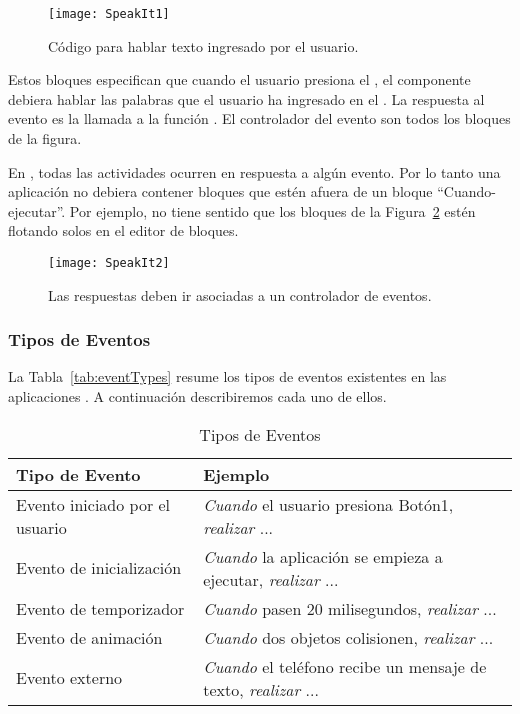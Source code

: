\begin{figure}[H]
  \centering
  \texttt{[image: SpeakIt1]}
  \caption{Código para hablar texto ingresado por el usuario.}
  \label{fig:speakit1}
\end{figure}

Estos bloques especifican que cuando el usuario presiona el , el componente  debiera hablar las palabras que el usuario ha ingresado en el . La respuesta al evento  es la llamada a la función . El controlador del evento son todos los bloques de la figura.

En \AppInventor, todas las actividades ocurren en respuesta a algún evento. Por lo tanto una aplicación no debiera contener bloques que estén afuera de un bloque “Cuando-ejecutar”. Por ejemplo, no tiene sentido que los bloques de la Figura~\ref{fig:speakit2} estén flotando solos en el editor de bloques.

\begin{figure}[H]
  \centering
  \texttt{[image: SpeakIt2]}
  \caption{Las respuestas deben ir asociadas a un controlador de eventos.}
  \label{fig:speakit2}
\end{figure}

\subsubsection*{Tipos de Eventos}

La Tabla~\ref{tab:eventTypes} resume los tipos de eventos existentes
en las aplicaciones \AppInventor. A continuación describiremos cada
uno de ellos.

\begin{table}[H]
  \begin{small}
    \begin{tabular}{|l|l|}
      \hline
      \textbf{Tipo de Evento} & \textbf{Ejemplo}\\
      \hline
      Evento iniciado por el usuario & \emph{Cuando} el usuario presiona Botón1, \emph{realizar} ...\\
      \hline
      Evento de inicialización & \emph{Cuando} la aplicación se empieza a ejecutar, \emph{realizar} ...\\
      \hline
      Evento de temporizador & \emph{Cuando} pasen 20 milisegundos, \emph{realizar} ...\\
      \hline
      Evento de animación & \emph{Cuando} dos objetos colisionen, \emph{realizar} ...\\
      \hline
      Evento externo & \emph{Cuando} el teléfono recibe un mensaje de texto, \emph{realizar} ...\\
      \hline
    \end{tabular}
  \end{small}
  \caption{Tipos de Eventos}
  \label{fig:eventTypes}
\end{table}

